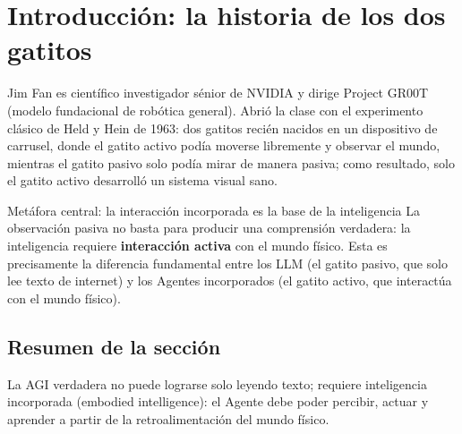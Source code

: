 \section{Introducción: la historia de los dos gatitos}

Jim Fan es científico investigador sénior de NVIDIA y dirige Project GR00T (modelo fundacional de robótica general). Abrió la clase con el experimento clásico de Held y Hein de 1963: dos gatitos recién nacidos en un dispositivo de carrusel, donde el gatito activo podía moverse libremente y observar el mundo, mientras el gatito pasivo solo podía mirar de manera pasiva; como resultado, solo el gatito activo desarrolló un sistema visual sano.

\begin{importantbox}{Metáfora central: la interacción incorporada es la base de la inteligencia}
La observación pasiva no basta para producir una comprensión verdadera: la inteligencia requiere \textbf{interacción activa} con el mundo físico. Esta es precisamente la diferencia fundamental entre los LLM (el gatito pasivo, que solo lee texto de internet) y los Agentes incorporados (el gatito activo, que interactúa con el mundo físico).
\end{importantbox}

\subsection{Resumen de la sección}

La AGI verdadera no puede lograrse solo leyendo texto; requiere inteligencia incorporada (embodied intelligence): el Agente debe poder percibir, actuar y aprender a partir de la retroalimentación del mundo físico.

